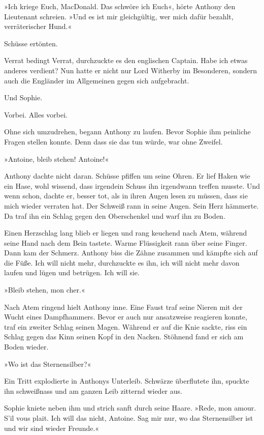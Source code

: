 »Ich kriege Euch, MacDonald. Das schwöre ich Euch«, hörte Anthony
den Lieutenant schreien. »Und es ist mir gleichgültig, wer mich
dafür bezahlt, verräterischer Hund.«

Schüsse ertönten.

Verrat bedingt Verrat, durchzuckte es den englischen Captain. Habe
ich etwas anderes verdient? Nun hatte er nicht nur Lord Witherby im
Besonderen, sondern auch die Engländer im Allgemeinen gegen sich
aufgebracht.

Und Sophie.

Vorbei. Alles vorbei.

Ohne sich umzudrehen, begann Anthony zu laufen. Bevor Sophie ihm
peinliche Fragen stellen konnte. Denn dass sie das tun würde, war
ohne Zweifel.

»Antoine, bleib stehen! Antoine!«

Anthony dachte nicht daran. Schüsse pfiffen um seine Ohren. Er lief
Haken wie ein Hase, wohl wissend, dass irgendein Schuss ihn
irgendwann treffen musste. Und wenn schon, dachte er, besser tot,
als in ihren Augen lesen zu müssen, dass sie mich wieder verraten
hat. Der Schweiß rann in seine Augen. Sein Herz hämmerte. Da traf
ihn ein Schlag gegen den Oberschenkel und warf ihn zu Boden.

Einen Herzschlag lang blieb er liegen und rang keuchend nach Atem,
während seine Hand nach dem Bein tastete. Warme Flüssigkeit rann
über seine Finger. Dann kam der Schmerz. Anthony biss die Zähne
zusammen und kämpfte sich auf die Füße. Ich will nicht mehr,
durchzuckte es ihn, ich will nicht mehr davon laufen und lügen und
betrügen. Ich will sie.

»Bleib stehen, mon cher.«

Nach Atem ringend hielt Anthony inne. Eine Faust traf seine Nieren
mit der Wucht eines Dampfhammers. Bevor er auch nur ansatzweise
reagieren konnte, traf ein zweiter Schlag seinen Magen. Während er
auf die Knie sackte, riss ein Schlag gegen das Kinn seinen Kopf in
den Nacken. Stöhnend fand er sich am Boden wieder.

»Wo ist das Sternensilber?«

Ein Tritt explodierte in Anthonys Unterleib. Schwärze überflutete
ihn, spuckte ihn schweißnass und am ganzen Leib zitternd wieder
aus.

Sophie kniete neben ihm und strich sanft durch seine Haare. »Rede,
mon amour. S'il vous plait. Ich will das nicht, Antoine. Sag mir
nur, wo das Sternensilber ist und wir sind wieder Freunde.«

